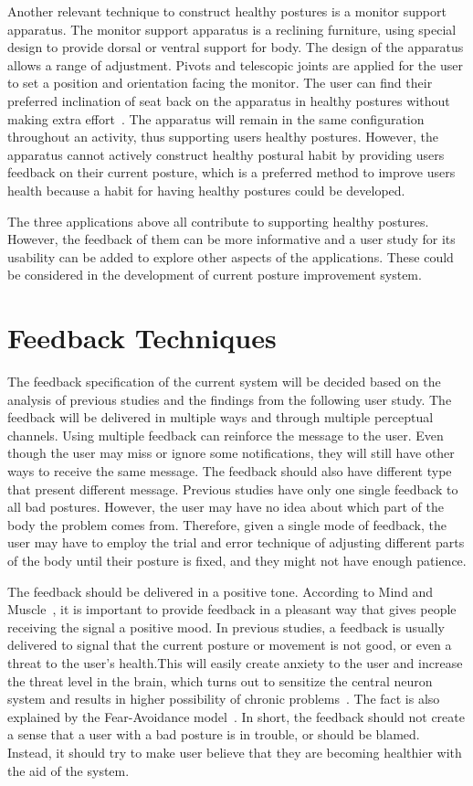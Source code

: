 Another relevant technique to construct healthy postures is a monitor support apparatus. The monitor support apparatus is a reclining furniture, using special design to provide dorsal or ventral support for body. The design of the apparatus allows a range of adjustment. Pivots and telescopic joints are applied for the user to set a position and orientation facing the monitor. The user can find their preferred inclination of seat back on the apparatus in healthy postures without making extra effort~\cite{monitor_support_apparatus}. The apparatus will remain in the same configuration throughout an activity, thus supporting users healthy postures. However, the apparatus cannot actively construct healthy postural habit by providing users feedback on their current posture, which is a preferred method to improve users health because a habit for having healthy postures could be developed.

The three applications above all contribute to supporting healthy postures. However, the feedback of them can be more informative and a user study for its usability can be added to explore other aspects of the applications. These could be considered in the development of current posture improvement system.

\section{Feedback Techniques}
The feedback specification of the current system will be decided based on the analysis of previous studies and the findings from the following user study. The feedback will be delivered in multiple ways and through multiple perceptual channels. Using multiple feedback can reinforce the message to the user. Even though the user may miss or ignore some notifications, they will still have other ways to receive the same message. The feedback should also have different type that present different message. Previous studies have only one single feedback to all bad postures. However, the user may have no idea about which part of the body the problem comes from. Therefore, given a single mode of feedback, the user may have to employ the trial and error technique of adjusting different parts of the body until their posture is fixed, and they might not have enough patience.

The feedback should be delivered in a positive tone. According to Mind and Muscle~\cite{mindandmuscle_correct_posture}, it is important to provide feedback in a pleasant way that gives people receiving the signal a positive mood. In previous studies, a feedback is usually delivered to signal that the current posture or movement is not good, or even a threat to the user's health.This will easily create anxiety to the user and increase the threat level in the brain, which turns out to sensitize the central neuron system and results in higher possibility of chronic problems~\cite{mindandmuscle_correct_posture}. The fact is also explained by the Fear-Avoidance model~\cite{fear_avoidance_model_pain}. In short, the feedback should not create a sense that a user with a bad posture is in trouble, or should be blamed. Instead, it should try to make user believe that they are becoming healthier with the aid of the system.
